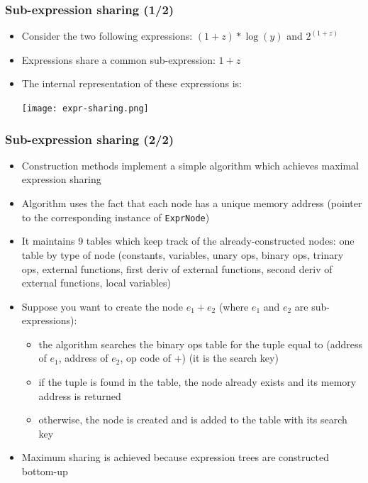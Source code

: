 \documentclass{beamer}
\begin{document}
\begin{frame}
  \frametitle{Sub-expression sharing (1/2)}
  \begin{itemize}
  \item Consider the two following expressions: $(1+z)*\log(y)$ and $2^{(1+z)}$
  \item Expressions share a common sub-expression: $1+z$
  \item The internal representation of these expressions is:
    \begin{center}
      \texttt{[image: expr-sharing.png]}
    \end{center}
  \end{itemize}
\end{frame}

\begin{frame}
  \frametitle{Sub-expression sharing (2/2)}
  \begin{itemize}
  \item Construction methods implement a simple algorithm which achieves maximal expression sharing
  \item Algorithm uses the fact that each node has a unique memory address (pointer to the corresponding instance of \texttt{ExprNode})
  \item It maintains 9 tables which keep track of the already-constructed nodes: one table by type of node (constants, variables, unary ops, binary ops, trinary ops, external functions, first deriv of external functions, second deriv of external functions, local variables)
  \item Suppose you want to create the node $e_1+e_2$ (where $e_1$ and $e_2$ are sub-expressions):
    \begin{itemize}
    \item the algorithm searches the binary ops table for the tuple equal to (address of $e_1$, address of $e_2$, op code of +) (it is the \alert{search key})
    \item if the tuple is found in the table, the node already exists and its memory address is returned
    \item otherwise, the node is created and is added to the table with its search key
    \end{itemize}
  \item Maximum sharing is achieved because expression trees are constructed bottom-up
  \end{itemize}
\end{frame}
\end{document}
